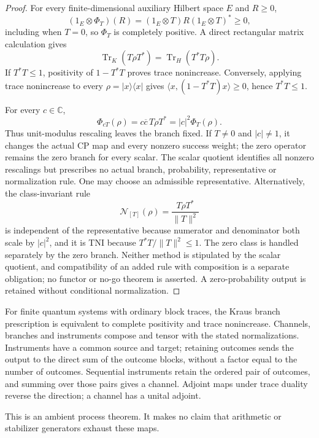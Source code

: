 \begin{proof}
For every finite-dimensional auxiliary Hilbert space $E$ and $R\geq0$,
\[
 (1_E\otimes\Phi_T)(R)=(1_E\otimes T)R(1_E\otimes T)^*\geq0,
\]
including when $T=0$, so $\Phi_T$ is completely positive.  A direct
rectangular matrix calculation gives
\[
 \operatorname{Tr}_K(T\rho T^*)=\operatorname{Tr}_H(T^*T\rho).
\]
If $T^*T\leq1$, positivity of $1-T^*T$ proves trace nonincrease.  Conversely,
applying trace nonincrease to every $\rho=|x\rangle\langle x|$ gives
$\langle x,(1-T^*T)x\rangle\geq0$, hence $T^*T\leq1$.

For every $c\in\mathbb C$,
\[
 \Phi_{cT}(\rho)=c\overline c\,T\rho T^*
 =|c|^2\Phi_T(\rho).
\]
Thus unit-modulus rescaling leaves the branch fixed.  If $T\ne0$ and
$|c|\ne1$, it changes the actual CP map and every nonzero success weight;
the zero operator remains the zero branch for every scalar.  The scalar
quotient identifies all nonzero rescalings but prescribes no actual branch,
probability, representative or normalization rule.  One may choose an
admissible representative.  Alternatively, the class-invariant rule
\[
 \mathcal N_{[T]}(\rho)=\frac{T\rho T^*}{\lVert T\rVert^2}
\]
is independent of the representative because numerator and denominator both
scale by $|c|^2$, and it is TNI because
$T^*T/\lVert T\rVert^2\leq1$.  The zero class is handled separately by the
zero branch.  Neither method is stipulated by the scalar quotient, and
compatibility of an added rule with composition is a separate obligation;
no functor or no-go theorem is asserted.  A zero-probability output is
retained without conditional normalization.
\end{proof}

\begin{proposition}
\statusProved{}
For finite quantum systems with ordinary block traces, the Kraus branch prescription
is equivalent to complete positivity and trace nonincrease. Channels, branches and
instruments compose and tensor with the stated normalizations. Instruments have a
common source and target; retaining outcomes sends the output to the direct sum of
the outcome blocks, without a factor equal to the number of outcomes. Sequential
instruments retain the ordered pair of outcomes, and summing over those pairs gives a
channel. Adjoint maps under trace duality reverse the direction; a channel has a
unital adjoint.
\end{proposition}
\begin{scope}
This is an ambient process theorem. It makes no claim that arithmetic or stabilizer generators exhaust these maps.
\end{scope}

